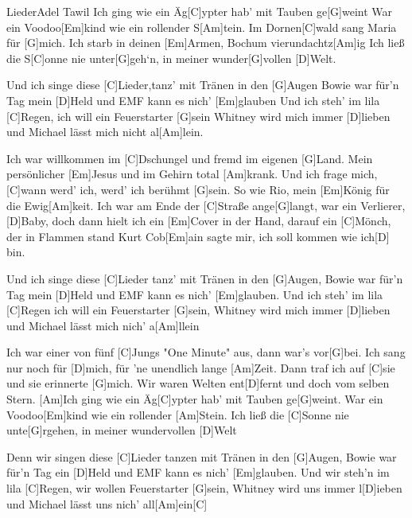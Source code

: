 \documentclass[../main.tex]{subfiles}
\begin{document}
\begin{song}[3]{Lieder}{Adel Tawil}{}
Ich ging wie ein Äg[C]ypter hab' mit Tauben ge[G]weint
War ein Voodoo[Em]kind wie ein rollender S[Am]tein.
Im Dornen[C]wald sang Maria für [G]mich.
Ich starb in deinen [Em]Armen, Bochum vierundachtz[Am]ig
Ich ließ die S[C]onne nie unter[G]geh`n, in meiner wunder[G]vollen [D]Welt.

Und ich singe diese [C]Lieder,tanz' mit Tränen in den [G]Augen
Bowie war für'n Tag mein [D]Held und EMF kann es nich' [Em]glauben
Und ich steh' im lila [C]Regen, ich will ein Feuerstarter [G]sein
Whitney wird mich immer [D]lieben und Michael lässt mich nicht al[Am]lein.

Ich war willkommen im [C]Dschungel und fremd im eigenen [G]Land.
Mein persönlicher [Em]Jesus und im Gehirn total [Am]krank.
Und ich frage mich, [C]wann werd' ich, werd' ich berühmt [G]sein.
So wie Rio, mein [Em]König für die Ewig[Am]keit.
Ich war am Ende der [C]Straße ange[G]langt,
war ein Verlierer, [D]Baby, doch dann hielt ich ein [Em]Cover in der Hand,
darauf ein [C]Mönch, der in Flammen stand
Kurt Cob[Em]ain sagte mir, ich soll kommen wie ich[D] bin.

Und ich singe diese [C]Lieder tanz' mit Tränen in den [G]Augen,
Bowie war für'n Tag mein [D]Held und EMF kann es nich' [Em]glauben.
Und ich steh' im lila [C]Regen ich will ein Feuerstarter [G]sein,
Whitney wird mich immer [D]lieben und Michael lässt mich nich' a[Am]llein\

Ich war einer von fünf [C]Jungs "One Minute" aus, dann war's vor[G]bei.
Ich sang nur noch für [D]mich, für 'ne unendlich lange [Am]Zeit.
Dann traf ich auf [C]sie und sie erinnerte [G]mich.
Wir waren Welten ent[D]fernt und doch vom selben Stern.
[Am]Ich ging wie ein Äg[C]ypter hab' mit Tauben ge[G]weint.
War ein Voodoo[Em]kind wie ein rollender [Am]Stein.
Ich ließ die [C]Sonne nie unte[G]rgehen, in meiner wundervollen [D]Welt

Denn wir singen diese [C]Lieder tanzen mit Tränen in den [G]Augen,
Bowie war für'n Tag ein [D]Held und EMF kann es nich' [Em]glauben.
Und wir steh'n im lila [C]Regen, wir wollen  Feuerstarter [G]sein,
Whitney wird uns immer l[D]ieben und Michael lässt uns nich' all[Am]ein[C]

\end{song}
\end{document}

